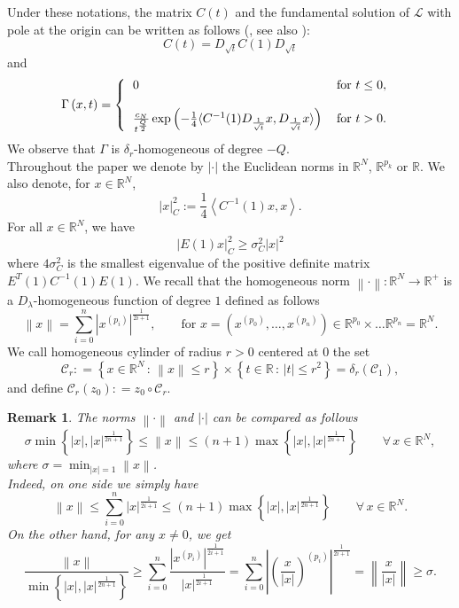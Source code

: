 \documentclass[10pt]{amsart}
\def \RN {\mathbb{R}^N}
\def \R {\mathbb{R}}
\def \Cyl {\mathcal{C}}
\def\elle{\mathcal{L}}
\newtheorem{remark}[theorem]{Remark}
\numberwithin{equation}{section}
\begin{document}
Under these notations, the matrix $C(t)$ and the fundamental solution of $\elle$ with pole at the origin can be written as follows (\cite[Proposition 2.3]{LP}, see also \cite{K82}):
$$C(t)= D_{\sqrt{t}} C(1) D_{\sqrt{t}} $$
and
\begin{equation}
\Gamma \left(x,t\right)  =\left\{
\begin{tabular}
[c]{lll}
$0$ & $\text{for }t\leq0,$\\ \mbox{}\\
$\frac{c_N}{t^{\frac{Q}{2}}} \exp \left(  -\frac{1}{4}  \langle C^{-1} (1) D_{\frac{1}{\sqrt{t}}}  x,  D_{\frac{1}{\sqrt{t}}}  x \rangle \right)  $ & $\text{for } t>0.$
\end{tabular}
\ \right. \nonumber
\end{equation}
We observe that $\Gamma$ is $\delta_r$-homogeneous of degree $-Q$.\\
Throughout the paper we denote by $\left|\cdot\right|$ the Euclidean norms in $\R^N$, $\R^{p_k}$ or $\R$. We also denote, for $x\in\RN$,
$$\left|x\right|_C^2:=\frac{1}{4}\left\langle C^{-1}(1)x,x\right\rangle.$$
For all $x\in\R^N$, we have 
\begin{equation}\label{cnonc}
\left|E(1)x\right|_C^2\geq \sigma_C^2 \left|x\right|^2
\end{equation}
where $4\sigma_C^2$ is the smallest eigenvalue of the positive definite matrix $E^T(1)C^{-1}(1)E(1)$. We recall that the homogeneous norm $\left\|\cdot\right\|:\RN\longrightarrow\R^+$ is a $D_\lambda$-homogeneous function of degree $1$ defined as follows
$$\left\|x\right\|=\sum_{i=0}^n\left|x^{(p_i)}\right|^{\frac{1}{2i+1}},\qquad\mbox{for }x=\left(x^{(p_0)},\ldots,x^{(p_n)}\right)\in\R^{p_0}\times\ldots\R^{p_n}=\RN.$$
We call homogeneous cylinder of radius $r>0$ centered at $0$ the set
$$\Cyl_{r}: =\left\{x\in\RN\,:\,\left\|x\right\|\leq r\right\}\times\left\{t\in\R\,:\,\left|t\right|\leq r^2\right\}=\delta_{r}\left(\Cyl_1\right),$$
and define $\Cyl_r(z_0): =z_0\circ\Cyl_r$. 

\begin{remark}
The norms $\left\|\cdot\right\|$ and $\left|\cdot\right|$ can be compared as follows
\begin{equation}\label{confrhomnonhom}
\sigma\min{\left\{\left|x\right|, \left|x\right|^{\frac{1}{2n+1}}\right\}}\leq\left\|x\right\|\leq (n+1)\max{\left\{\left|x\right|, \left|x\right|^{\frac{1}{2n+1}}\right\}}\qquad \forall\,x\in\RN,
\end{equation}
where $\sigma=\min_{\left|x\right|=1}{\left\|x\right\|}$.\\
Indeed, on one side we simply have
$$\left\|x\right\|\leq \sum_{i=0}^n\left|x\right|^{\frac{1}{2i+1}}\leq (n+1)\max{\left\{\left|x\right|, \left|x\right|^{\frac{1}{2n+1}}\right\}}\qquad \forall\,x\in\RN.$$
On the other hand, for any $x\neq 0$, we get
$$\frac{\left\|x\right\|}{\min{\left\{\left|x\right|,\left|x\right|^{\frac{1}{2n+1}}\right\}}}\geq\sum_{i=0}^n{\frac{\left|x^{(p_i)}\right|^{\frac{1}{2i+1}}}{\left|x\right|^{\frac{1}{2i+1}}}}=\sum_{i=0}^n{\left|\left(\frac{x}{\left|x\right|}\right)^{(p_i)}\right|^{\frac{1}{2i+1}}}=\left\|\frac{x}{\left|x\right|}\right\|\geq\sigma.$$
\end{remark}
\end{document}
